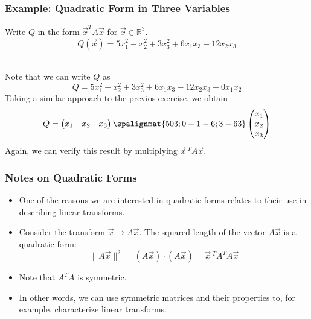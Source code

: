 \begin{frame}\frametitle{Example: Quadratic Form in Three Variables}

     Write $Q$ in the form $\vec x^{T} A \vec x  $ for $\vec x \in \mathbb R^3$. 
     $$Q (\vec x) =  5 x_1 ^2 - x_2 ^2 + 3 x_3 ^2 +6 x_1 x_3 - 12 x_2 x_3$$
    
    \pause 
    \\
    Note that we can write $Q$ as 
    $$Q =  5 x_1 ^2 - x_2 ^2 + 3 x_3 ^2 +6 x_1 x_3 - 12 x_2 x_3 + 0 x_1x_2$$
    Taking a similar approach to the previos exercise, we obtain
    $$Q = \begin{pmatrix} x_1 & x_2 & x_3 \end{pmatrix} \spalignmat{5 0 3;0 -1 -6;3 -6 3} \begin{pmatrix} x_1 \\ x_2 \\ x_3 \end{pmatrix}
    $$
    Again, we can verify this result by multiplying $\vec x \, ^T A \vec x$.     
\end{frame}




\begin{frame}\frametitle{Notes on Quadratic Forms}

    \begin{itemize}
        \item<1-> One of the reasons we are interested in quadratic forms relates to their use in describing linear transforms.
        \item<2-> Consider the transform $\vec x \to A\vec x$. The squared length of the vector $A\vec x$ is a quadratic form: 
    $$\lVert A \vec x \rVert^2 = (A\vec x) \cdot (A\vec x) = \vec x \, ^T A^TA \vec x$$
        \item<3-> Note that $A^TA$ is symmetric. 
        \item<4-> In other words, we can use symmetric matrices and their properties to, for example, characterize linear transforms.
    \end{itemize}
    
\end{frame}


